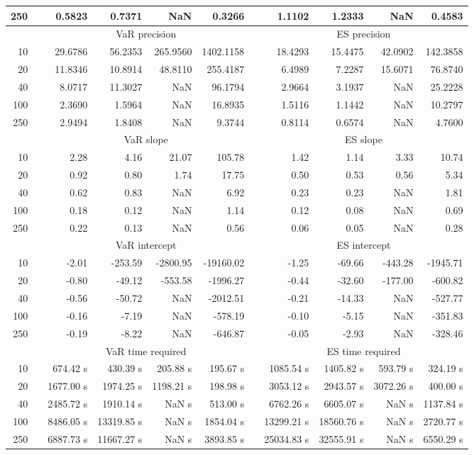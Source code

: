 {\begin{table}[h]
\begin{tabular}{rr rrrr r rrrr}
250 && 0.5823  & 0.7371  &    NaN & 0.3266 && 1.1102  & 1.2333  &    NaN & 0.4583 \\ 
\hline 
 & & \multicolumn{4}{c}{VaR precision} &&  \multicolumn{4}{c}{ES precision} \\ \cline{3-6}  \cline{8-11}
10 && 29.6786 & 56.2353 & 265.9560 & 1402.1158 & & 18.4293 & 15.4475 & 42.0902 & 142.3858 \\ 
20 && 11.8346 & 10.8914 & 48.8110 & 255.4187 & & 6.4989 & 7.2287 & 15.6071 & 76.8740 \\ 
40 && 8.0717 & 11.3027 &    NaN & 96.1794 & & 2.9664 & 3.1937 &    NaN & 25.2228 \\ 
100 && 2.3690 & 1.5964 &    NaN & 16.8935 & & 1.5116 & 1.1442 &    NaN & 10.2797 \\ 
250 && 2.9494 & 1.8408 &    NaN & 9.3744 & & 0.8114 & 0.6574 &    NaN & 4.7600 \\ 
\hline 
 & & \multicolumn{4}{c}{ VaR slope} && \multicolumn{4}{c}{ES slope} \\ \cline{3-6}  \cline{8-11}
10 && 2.28 & 4.16 & 21.07 & 105.78 && 1.42 & 1.14 & 3.33 & 10.74 \\ 
20 && 0.92 & 0.80 & 1.74 & 17.75 && 0.50 & 0.53 & 0.56 & 5.34 \\ 
40 && 0.62 & 0.83 &  NaN & 6.92 && 0.23 & 0.23 &  NaN & 1.81 \\ 
100 && 0.18 & 0.12 &  NaN & 1.14 && 0.12 & 0.08 &  NaN & 0.69 \\ 
250 && 0.22 & 0.13 &  NaN & 0.56 && 0.06 & 0.05 &  NaN & 0.28 \\ 
\hline 
 & & \multicolumn{4}{c}{ VaR intercept} &&  \multicolumn{4}{c}{ES intercept} \\ \cline{3-6}  \cline{8-11}
10 && -2.01 & -253.59 & -2800.95 & -19160.02 && -1.25 & -69.66 & -443.28 & -1945.71 \\ 
20 && -0.80 & -49.12 & -553.58 & -1996.27 && -0.44 & -32.60 & -177.00 & -600.82 \\ 
40 && -0.56 & -50.72 &  NaN & -2012.51 && -0.21 & -14.33 &  NaN & -527.77 \\ 
100 && -0.16 & -7.19 &  NaN & -578.19 && -0.10 & -5.15 &  NaN & -351.83 \\ 
250 && -0.19 & -8.22 &  NaN & -646.87 && -0.05 & -2.93 &  NaN & -328.46 \\ 
\hline 
 & & \multicolumn{4}{c}{VaR time required} && \multicolumn{4}{c}{ES time required} \\ \cline{3-6}  \cline{8-11}
10 & & 674.42 s & 430.39 s & 205.88 s & 195.67 s && 1085.54 s & 1405.82 s & 593.79 s & 324.19 s \\ 
20 & & 1677.00 s & 1974.25 s & 1198.21 s & 198.98 s && 3053.12 s & 2943.57 s & 3072.26 s & 400.00 s \\ 
40 & & 2485.72 s & 1910.14 s &  NaN s & 513.00 s && 6762.26 s & 6605.07 s &  NaN s & 1137.84 s \\ 
100 & & 8486.05 s & 13319.85 s &  NaN s & 1854.04 s && 13299.21 s & 18560.76 s &  NaN s & 2720.77 s \\ 
250 & & 6887.73 s & 11667.27 s &  NaN s & 3893.85 s && 25034.83 s & 32555.91 s &  NaN s & 6550.29 s \\ 
\hline 
\end{tabular} 
\end{table} 
} 
